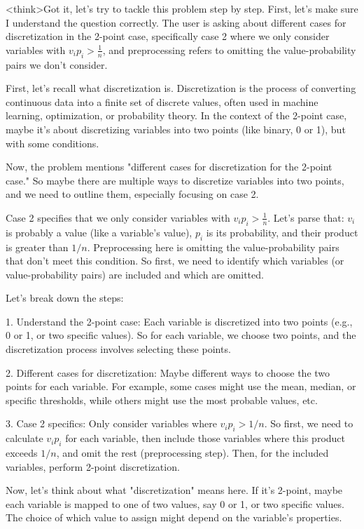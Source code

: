 <think>Got it, let's try to tackle this problem step by step. First, let's make sure I understand the question correctly. The user is asking about different cases for discretization in the 2-point case, specifically case 2 where we only consider variables with \( v_i p_i > \frac{1}{n} \), and preprocessing refers to omitting the value-probability pairs we don't consider. 

First, let's recall what discretization is. Discretization is the process of converting continuous data into a finite set of discrete values, often used in machine learning, optimization, or probability theory. In the context of the 2-point case, maybe it's about discretizing variables into two points (like binary, 0 or 1), but with some conditions.

Now, the problem mentions "different cases for discretization for the 2-point case." So maybe there are multiple ways to discretize variables into two points, and we need to outline them, especially focusing on case 2. 

Case 2 specifies that we only consider variables with \( v_i p_i > \frac{1}{n} \). Let's parse that: \( v_i \) is probably a value (like a variable's value), \( p_i \) is its probability, and their product is greater than \( 1/n \). Preprocessing here is omitting the value-probability pairs that don't meet this condition. So first, we need to identify which variables (or value-probability pairs) are included and which are omitted.

Let's break down the steps:

1. Understand the 2-point case: Each variable is discretized into two points (e.g., 0 or 1, or two specific values). So for each variable, we choose two points, and the discretization process involves selecting these points.

2. Different cases for discretization: Maybe different ways to choose the two points for each variable. For example, some cases might use the mean, median, or specific thresholds, while others might use the most probable values, etc.

3. Case 2 specifics: Only consider variables where \( v_i p_i > 1/n \). So first, we need to calculate \( v_i p_i \) for each variable, then include those variables where this product exceeds \( 1/n \), and omit the rest (preprocessing step). Then, for the included variables, perform 2-point discretization.

Now, let's think about what "discretization" means here. If it's 2-point, maybe each variable is mapped to one of two values, say 0 or 1, or two specific values. The choice of which value to assign might depend on the variable's properties.

